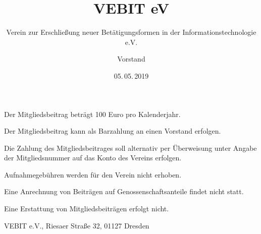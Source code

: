 \documentclass[fontsize=11pt,pagesize,parskip=half]{scrartcl}
\begin{document}
\author{Vorstand}
\subject{Beitragsordnung}
\title{VEBIT eV}
\subtitle{Verein zur Erschließung neuer Betätigungsformen in der Informationstechnologie e.V.}
\date{05.\,05.\,2019}
\maketitle



\appendix

\begin{contract}


Der Mitgliedsbeitrag beträgt 100 Euro pro Kalenderjahr.


Der Mitgliedsbeitrag kann als Barzahlung an einen Vorstand erfolgen.

Die Zahlung des Mitgliedsbeitrages soll alternativ per Überweisung unter Angabe der Mitgliedsnummer auf das Konto des Vereins erfolgen.


Aufnahmegebühren werden für den Verein nicht erhoben.

Eine Anrechnung von Beiträgen auf Genossenschaftsanteile findet nicht statt.

Eine Erstattung von Mitgliedsbeiträgen erfolgt nicht.

\end{contract}

\vfill

VEBIT e.V., Riesaer Straße 32, 01127 Dresden
\end{document}
